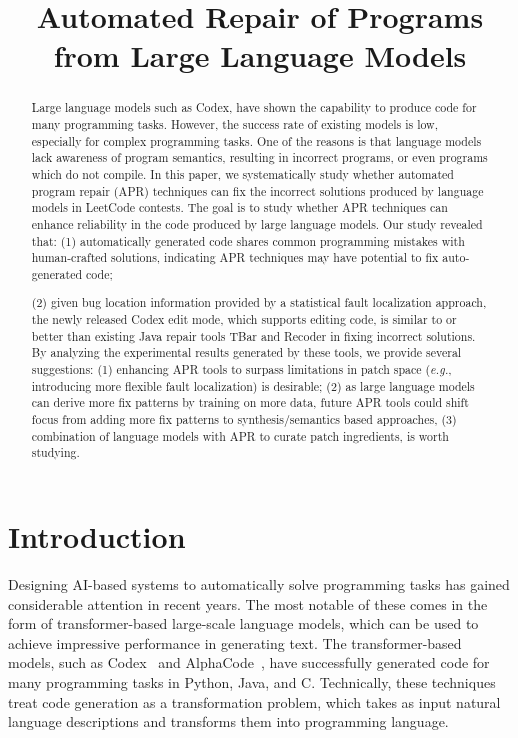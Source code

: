 \title{Automated Repair of Programs from Large Language Models}

\begin{abstract}
Large language models such as Codex, have shown the capability to produce code for many programming tasks. However, the success rate of existing models is low, especially for complex programming tasks. One of the reasons is that language models lack awareness of program semantics, resulting in incorrect programs, or even programs which do not compile. In this paper, we systematically study whether automated program repair (APR) techniques can fix the incorrect solutions produced by language models in LeetCode contests. The goal is to study whether APR techniques can enhance reliability in the code produced by large language models. Our study revealed that: (1) automatically generated code shares common programming mistakes with human-crafted solutions, indicating APR techniques may have potential to fix auto-generated code; 

(2) given bug location information provided by a statistical fault localization approach, the newly released Codex edit mode, which supports editing code,  is similar to or better than existing Java repair tools TBar and Recoder in fixing incorrect solutions. By analyzing the experimental results generated by these tools, we provide several suggestions: (1) enhancing APR tools to surpass limitations in patch space ({\em e.g.}, introducing more flexible fault localization) is desirable; (2) as large language models can derive more fix patterns by training on more data, future APR tools could shift focus from adding more fix patterns to  synthesis/semantics based approaches, (3) combination of language models with APR to curate patch ingredients, is worth studying.
\end{abstract}

\section{Introduction}
\label{sec:intro}

Designing AI-based systems to automatically solve programming tasks has gained considerable attention in recent years. The most notable of these comes in the form of transformer-based large-scale language models, which can be used to achieve impressive performance in generating text. The transformer-based models, such as Codex~\cite{codex} and AlphaCode~\cite{alphacode}, have successfully generated code for many programming tasks in Python, Java, and C. Technically, these techniques treat code generation as a transformation problem, which takes as input natural language descriptions and transforms them into programming language.

